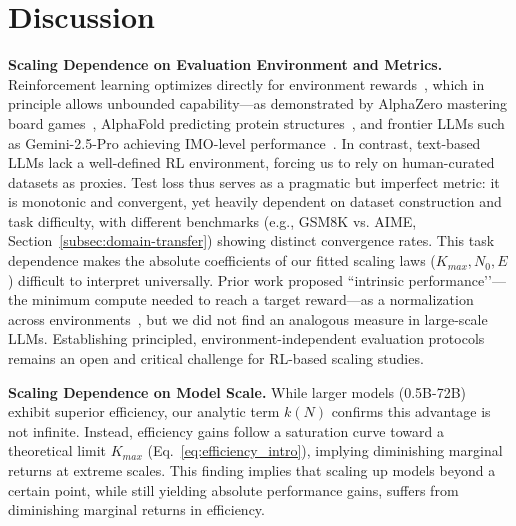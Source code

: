 \section{Discussion}
\textbf{Scaling Dependence on Evaluation Environment and Metrics.} 
Reinforcement learning optimizes directly for environment rewards~\citep{10.5555/3312046}, which in principle allows unbounded capability—as demonstrated by AlphaZero mastering board games~\citep{silver2017masteringchessshogiselfplay}, AlphaFold predicting protein structures~\citep{jumper2021highly}, and frontier LLMs such as Gemini-2.5-Pro achieving IMO-level performance~\citep{huang2025gemini25procapable}. In contrast, text-based LLMs lack a well-defined RL environment, forcing us to rely on human-curated datasets as proxies. Test loss thus serves as a pragmatic but imperfect metric: it is monotonic and convergent, yet heavily dependent on dataset construction and task difficulty, with different benchmarks (e.g., GSM8K vs. AIME, Section~\ref{subsec:domain-transfer}) showing distinct convergence rates. This task dependence makes the absolute coefficients of our fitted scaling laws ($K_{max}, N_0, E$) difficult to interpret universally. Prior work proposed ``intrinsic performance’’—the minimum compute needed to reach a target reward—as a normalization across environments~\citep{hilton2023scaling}, but we did not find an analogous measure in large-scale LLMs. Establishing principled, environment-independent evaluation protocols remains an open and critical challenge for RL-based scaling studies.

\textbf{Scaling Dependence on Model Scale.} 
While larger models (0.5B-72B) exhibit superior efficiency, our analytic term $k(N)$ confirms this advantage is not infinite. Instead, efficiency gains follow a saturation curve toward a theoretical limit $K_{max}$ (Eq.~\ref{eq:efficiency_intro}), implying diminishing marginal returns at extreme scales.
This finding implies that scaling up models beyond a certain point, while still yielding absolute performance gains, suffers from diminishing marginal returns in efficiency.


